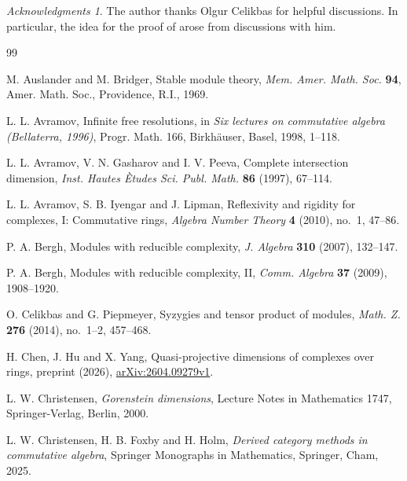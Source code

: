 \documentclass[10pt, a4paper,reqno]{amsart}
\theoremstyle{definition}
\theoremstyle{remark}
\newtheorem*{ac}{Acknowledgments}
\numberwithin{equation}{thm}
\begin{document}
\begin{ac}
The author thanks Olgur Celikbas for helpful discussions. 
In particular, the idea for the proof of  arose from discussions with him.
\end{ac}
\begin{thebibliography}{99}

{\sc M. Auslander and M. Bridger},
Stable module theory,
{\em Mem. Amer. Math. Soc.} \textbf{94},
Amer. Math. Soc., Providence, R.I., 1969.

{\sc L. L. Avramov},
Infinite free resolutions,
in {\em Six lectures on commutative algebra (Bellaterra, 1996)},
Progr. Math. 166,
Birkh\"auser, Basel, 1998, 1--118.

{\sc L. L. Avramov, V. N. Gasharov and I. V. Peeva},
Complete intersection dimension,
{\em Inst. Hautes \`Etudes Sci. Publ. Math.} \textbf{86} (1997), 67--114.

{\sc L. L. Avramov, S. B. Iyengar and J. Lipman},
Reflexivity and rigidity for complexes, I: Commutative rings,
{\em Algebra Number Theory} \textbf{4} (2010), no.~1, 47--86.

{\sc P. A. Bergh},
Modules with reducible complexity,
{\em J. Algebra} \textbf{310} (2007), 132--147.

{\sc P. A. Bergh},
Modules with reducible complexity, II,
{\em Comm. Algebra} \textbf{37} (2009), 1908--1920.

{\sc O. Celikbas and G. Piepmeyer},
Syzygies and tensor product of modules,
{\em Math. Z.} \textbf{276} (2014), no.~1--2, 457--468.

{\sc H. Chen, J. Hu and X. Yang},
Quasi-projective dimensions of complexes over rings,
preprint (2026), \href{https://arxiv.org/abs/2604.09279}{arXiv:2604.09279v1}.

{\sc L. W. Christensen},
{\em Gorenstein dimensions},
Lecture Notes in Mathematics 1747,
Springer-Verlag, Berlin, 2000.

{\sc L. W. Christensen, H. B. Foxby and H. Holm},
{\em Derived category methods in commutative algebra},
Springer Monographs in Mathematics, Springer, Cham, 2025.


\end{thebibliography}
\end{document}
